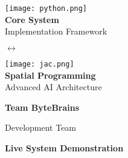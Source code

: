 \documentclass[12pt,a4paper]{article}
\begin{document}
\begin{titlepage}
\begin{tcolorbox}[
        colback=premiumgray,
        colframe=deepblue,
        boxrule=2pt,
        arc=3mm,
        width=0.9\textwidth
    ]
        \begin{minipage}{0.35\textwidth}
            \centering
            \texttt{[image: python.png]}
            \\[0.5cm]
            {\large\textbf{Core System}}\\
            {\small Implementation Framework}
        \end{minipage}
        \hspace{1cm}
        {\Large\color{accentorange}$\leftrightarrow$}
        \hspace{1cm}
        \begin{minipage}{0.35\textwidth}
            \centering
            \texttt{[image: jac.png]}
            \\[0.5cm]
            {\large\textbf{Spatial Programming}}\\
            {\small Advanced AI Architecture}
        \end{minipage}
    \end{tcolorbox}
    
    \vspace{1.5cm}
    
    {\LARGE\textbf{\color{deepblue}Team ByteBrains}\par}
    \vspace{0.5cm}
    {\large Development Team\par}
    
    \vspace{1.5cm}
    
    \begin{tcolorbox}[
        colback=techblue!10,
        colframe=techblue,
        boxrule=2pt,
        arc=3mm,
        width=0.9\textwidth
    ]
        \centering
        {\large\textbf{\color{techblue}Live System Demonstration}\par}
        \vspace{0.5cm}
        

\end{tcolorbox}
\end{titlepage}
\end{document}

